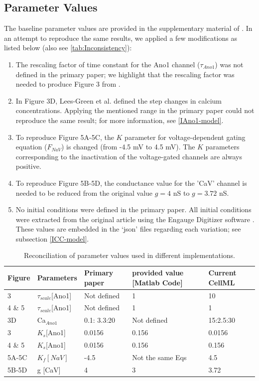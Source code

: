 \documentclass[fleqn,10pt]{physiome}
\begin{document}
\subsection{Parameter Values}
\label{Parameter_Values}
The baseline parameter values are provided in the supplementary material of \citet{lees2014computational}. In an attempt to reproduce the same results, we applied a few modifications as listed below (also see \autoref{tab:Inconsistency}):
\begin{enumerate}

\item The rescaling factor of time constant for the Ano1 channel ($\tau_{Ano1}$) was not defined in the primary paper; we highlight that the rescaling factor was needed to produce Figure 3 from \citet{lees2014computational}.
\item In Figure 3D, Lees-Green et al. defined the step changes in calcium concentrations. Applying the mentioned range in the primary paper could not reproduce the same result; for more information, see \autoref{IAno1-model}.  

\item To reproduce Figure 5A-5C, the $K$ parameter for voltage-dependent gating equation ($F_{NaV}$) is changed (from -4.5 mV to 4.5 mV). The $K$ parameters corresponding to the inactivation of the voltage-gated channels are always positive.

\item To reproduce Figure 5B-5D, the conductance value for the 'CaV' channel is needed to be reduced from the original value $g = 4$ nS  to $g = 3.72 $ nS. 
\item No initial conditions were defined in the primary paper. All initial conditions were extracted from the original article using the Engauge Digitizer software \citep{mark_mitchell_2020_3941227}. These values are embedded in the `json' files regarding each variation; see subsection \autoref{ICC-model}.
\end{enumerate}


\begin{table}[hbt!]\centering
\begin{tabular}{lllll}\hline
Figure & Parameters & Primary paper & provided value [Matlab Code] & Current CellML \\ \hline
3 & $ \tau_{scale}$[Ano1]  & Not defined  & 1   & 10\\
4 \& 5 & $\tau_{scale}$[Ano1]   & Not defined  & 1   & 1\\
3D & Ca$_{Ano1}$ & 0.1: 3.3:20 & Not defined & 15:2.5:30\\
3 & ${K_{s}}$[Ano1]  & 0.0156  &  0.156   & 0.0156\\
4 \& 5 & ${K_{s}}$[Ano1]  & 0.0156  &  0.156   & 0.156\\
5A-5C & $K_{f}[NaV]$ &-4.5& Not the same Eqs & 4.5\\
5B-5D & g [CaV] & 4 & 3 &  3.72\\ \hline

\end{tabular}\caption{Reconciliation of parameter values used in different implementations.}\label{tab:Inconsistency}
\end{table}
\end{document}
